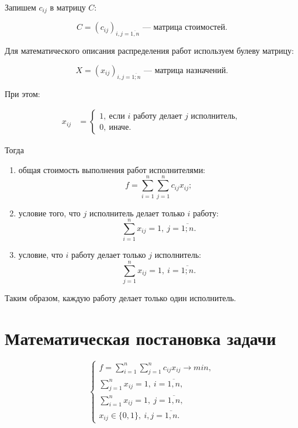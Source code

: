 Запишем $c_{ij}$ в матрицу $C$:

\begin{equation}
	C = (c_{ij})_{i,j = \overline{1, n}} \text{~---~матрица стоимостей}.
\end{equation}

Для математического описания распределения работ используем булеву матрицу:

\begin{equation}
	X = (x_{ij})_{i,j = \overline{1; n}}  \text{~---~матрица назначений}.
\end{equation}

При этом: 

\begin{align}
	x_{ij} & =
	\begin{cases}
		1, \: \text{если $i$ работу делает $j$ исполнитель}, \\
		0, \: \text{иначе}.
	\end{cases} \nonumber
\end{align}

Тогда

\begin{enumerate}
	\item общая стоимость выполнения работ исполнителями:
	\begin{equation}
		f = \sum_{i=1}^n \sum_{j=1}^n c_{ij} x_{ij};
	\end{equation}
	
	\item условие того, что $j$ исполнитель делает только $i$ работу:
	\begin{equation}
		\sum_{i=1}^n x_{ij} = 1, \: j = \overline{1; n}.
	\end{equation}
	
	\item условие, что $i$ работу делает только $j$ исполнитель:
	\begin{equation}
		\sum_{j=1}^n x_{ij} = 1, \: i = \overline{1; n}.
	\end{equation}
\end{enumerate}

Таким образом, каждую работу делает только один исполнитель.

\section{Математическая постановка задачи}

\begin{equation}
	\begin{cases}
		f = \sum_{i=1}^n \sum_{j=1}^n c_{ij} x_{ij} \rightarrow min, \\
		\sum_{j=1}^n x_{ij} = 1, \: i = \overline{1, n}, \\
		\sum_{i=1}^n x_{ij} = 1, \: j = \overline{1, n}, \\
		x_{ij} \in \{0, 1\}, \: i,j = \overline{1, n}.
	\end{cases}
\end{equation}

